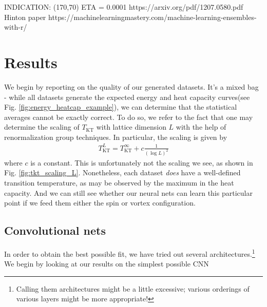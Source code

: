 \documentclass[]{article}
\begin{document}
INDICATION: (170,70) ETA = 0.0001
https://arxiv.org/pdf/1207.0580.pdf Hinton paper
https://machinelearningmastery.com/machine-learning-ensembles-with-r/

\section{Results}
We begin by reporting on the quality of our generated datasets. It's a mixed bag - while all datasets generate the expected energy and heat capacity curves(see Fig. \ref{fig:energy_heatcap_example}), we can determine that the statistical averages cannot be exactly correct. To do so, we refer to the fact that one may determine the scaling of $T_\text{KT}$ with lattice dimension $L$ with the help of renormalization group techniques. In particular, the scaling is given by\cite{PhysRevLett.39.1201}
\begin{align}
T_\text{KT}^L = T_\text{KT}^\infty + c\frac{1}{(\log L)^2}
\end{align}
where $c$ is a constant. This is unfortunately not the scaling we see, as shown in Fig. \ref{fig:tkt_scaling_L}. Nonetheless, each dataset \textit{does} have a well-defined transition temperature, as may be observed by the maximum in the heat capacity. And we can still see whether our neural nets can learn this particular point if we feed them either the spin or vortex configuration.

\subsection{Convolutional nets}
In order to obtain the best possible fit, we have tried out several architectures.\footnote{Calling them architectures might be a little excessive; various orderings of various layers might be more appropriate!} We begin by looking at our results on the simplest possible CNN





\end{document}
